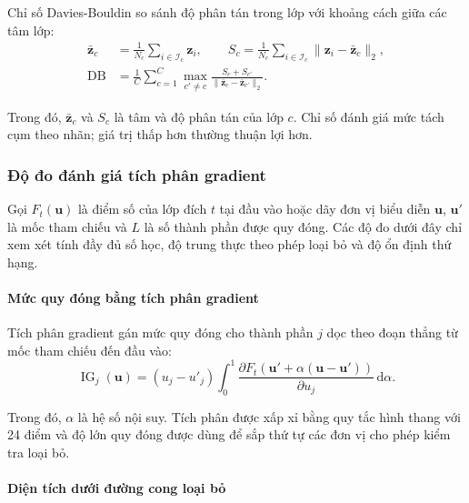 Chỉ số Davies-Bouldin \cite{Davies1979ClusterSeparation} so sánh độ phân tán trong lớp với khoảng cách giữa các tâm lớp:
\begin{equation}
\begin{aligned}
\bar{\boldsymbol{z}}_c&=\frac{1}{N_c}\sum_{i\in\mathcal{I}_c}\boldsymbol{z}_i,
\qquad
S_c=\frac{1}{N_c}\sum_{i\in\mathcal{I}_c}
\|\boldsymbol{z}_i-\bar{\boldsymbol{z}}_c\|_2,\\
\operatorname{DB}&=\frac{1}{C}\sum_{c=1}^{C}
\max_{c'\ne c}\frac{S_c+S_{c'}}
{\|\bar{\boldsymbol{z}}_c-\bar{\boldsymbol{z}}_{c'}\|_2}.
\end{aligned}
\label{eq:ch4_davies_bouldin}
\end{equation}

Trong đó, $\bar{\boldsymbol{z}}_c$ và $S_c$ là tâm và độ phân tán của lớp $c$. Chỉ số đánh giá mức tách cụm theo nhãn; giá trị thấp hơn thường thuận lợi hơn.

\subsubsection{Độ đo đánh giá tích phân gradient}

Gọi $F_t(\boldsymbol{u})$ là điểm số của lớp đích $t$ tại đầu vào hoặc dãy đơn vị biểu diễn $\boldsymbol{u}$, $\boldsymbol{u}'$ là mốc tham chiếu và $L$ là số thành phần được quy đóng. Các độ đo dưới đây chỉ xem xét tính đầy đủ số học, độ trung thực theo phép loại bỏ và độ ổn định thứ hạng.

\clearpage

\paragraph{Mức quy đóng bằng tích phân gradient}

Tích phân gradient \cite{Sundararajan2017IntegratedGradients} gán mức quy đóng cho thành phần $j$ dọc theo đoạn thẳng từ mốc tham chiếu đến đầu vào:
\begin{equation}
\operatorname{IG}_j(\boldsymbol{u})=(u_j-u'_j)
\int_{0}^{1}\frac{\partial F_t\!\left(
\boldsymbol{u}'+\alpha(\boldsymbol{u}-\boldsymbol{u}')\right)}
{\partial u_j}\,\mathrm{d}\alpha.
\label{eq:ch4_integrated_gradients}
\end{equation}

Trong đó, $\alpha$ là hệ số nội suy. Tích phân được xấp xỉ bằng quy tắc hình thang với 24 điểm và độ lớn quy đóng được dùng để sắp thứ tự các đơn vị cho phép kiểm tra loại bỏ.

\paragraph{Diện tích dưới đường cong loại bỏ}

